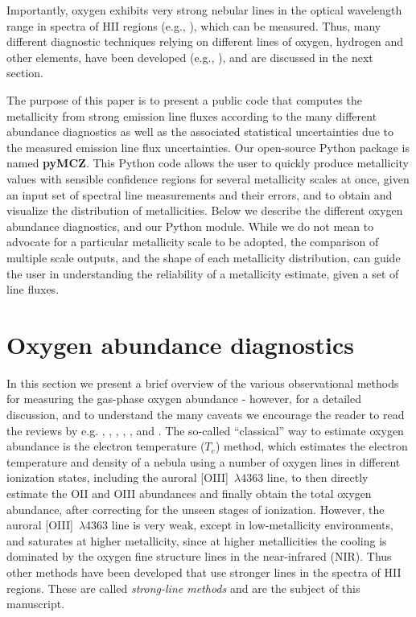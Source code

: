\documentclass{emulateapj}
\begin{document}
Importantly, oxygen exhibits very strong nebular lines in the optical wavelength range in spectra of HII regions (e.g., \citealt{pagel79,osterbrock89,tremonti04}), which can be measured. Thus, many different diagnostic techniques relying on different lines of oxygen, hydrogen and other elements, have been developed (e.g., \citealt{kewley02,pettini04,kobulnicky04,kewley08}), and are discussed in the next section. 

The purpose of this paper is to present a public code that computes the metallicity from strong emission line fluxes according to the many different abundance diagnostics as well as the associated statistical uncertainties due to the measured emission line flux uncertainties. Our open-source Python package is named \textbf{pyMCZ}.
This Python code allows the user to quickly produce metallicity values with sensible confidence regions for several metallicity scales at once, given an input set of spectral line measurements and their errors, and  to obtain and visualize the distribution of metallicities.
Below we describe the different oxygen abundance diagnostics, and our Python module. While we do not mean to advocate for a particular metallicity scale to be adopted, the comparison of multiple scale outputs, and the shape of each metallicity distribution, can guide the user in understanding the reliability of a metallicity estimate, given a set of line fluxes. 

\section{Oxygen abundance diagnostics}

In this section we present a brief overview of the various observational methods for measuring the gas-phase oxygen abundance - however, for a detailed discussion, and to understand the many caveats we encourage the reader to read the reviews by e.g. \citet{stasinska02}, \citet{kewley08}, \citet{moustakas10}, \citet{stasinska10}, \citet{dopita13}, and \citet{blanc15}.
The so-called ``classical'' way to estimate oxygen abundance is the electron temperature ($T_e$) method, which estimates the electron temperature and density of a nebula using a number of oxygen lines in different ionization states, including the auroral [OIII]~$\lambda$4363 line, to then directly estimate the OII and OIII abundances and finally obtain the total oxygen abundance, after correcting for the unseen stages of ionization. However, the auroral [OIII]~$\lambda$4363 line is very weak, except in low-metallicity environments, and saturates at higher metallicity, since at higher metallicities the cooling is dominated by the oxygen fine structure lines in the near-infrared (NIR).
Thus other methods have been developed that use stronger lines in the spectra of HII regions. These are called \emph{strong-line methods} and are the subject of this manuscript. 
\end{document}
